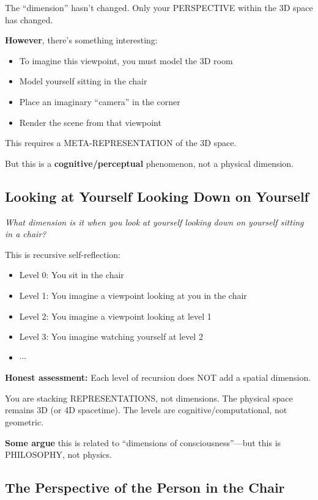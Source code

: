 \documentclass[12pt,a4paper]{article}
\begin{document}
The ``dimension'' hasn't changed. Only your PERSPECTIVE within the 3D space has changed.

\textbf{However}, there's something interesting:
\begin{itemize}
\item To imagine this viewpoint, you must model the 3D room
\item Model yourself sitting in the chair
\item Place an imaginary ``camera'' in the corner
\item Render the scene from that viewpoint
\end{itemize}

This requires a META-REPRESENTATION of the 3D space.

But this is a \textbf{cognitive/perceptual} phenomenon, not a physical dimension.

\subsection{Looking at Yourself Looking Down on Yourself}

\textit{What dimension is it when you look at yourself looking down on yourself sitting in a chair?}

This is recursive self-reflection:
\begin{itemize}
\item Level 0: You sit in the chair
\item Level 1: You imagine a viewpoint looking at you in the chair
\item Level 2: You imagine a viewpoint looking at level 1
\item Level 3: You imagine watching yourself at level 2
\item $\cdots$
\end{itemize}

\textbf{Honest assessment:} Each level of recursion does NOT add a spatial dimension.

You are stacking REPRESENTATIONS, not dimensions. The physical space remains 3D (or 4D spacetime). The levels are cognitive/computational, not geometric.

\textbf{Some argue} this is related to ``dimensions of consciousness''---but this is PHILOSOPHY, not physics.

\subsection{The Perspective of the Person in the Chair}
\end{document}

